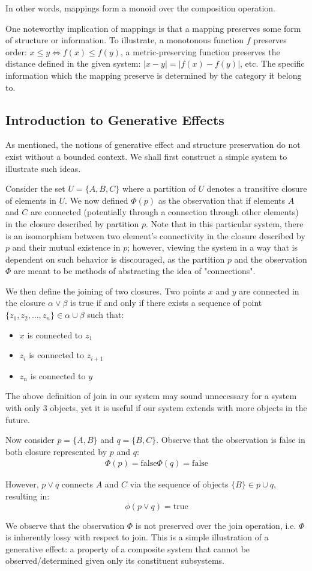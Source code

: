 \documentclass[12pt]{article}
\theoremstyle{definition}
\newcommand{\mo}[1]{\lvert #1 \rvert}
\begin{document}
	In other words, mappings form a monoid over the composition operation.
	
	One noteworthy implication of mappings is that a mapping preserves some form of structure or information. To illustrate, a monotonous function $f$ preserves order: $x \leq y \iff f(x) \leq f(y)$, a metric-preserving function preserves the distance defined in the given system: $\mo{x - y} = \mo{f(x) - f(y)}$, etc. The specific information which the mapping preserve is determined by the category it belong to.
	
	\subsection{Introduction to Generative Effects}
	
	As mentioned, the notions of generative effect and structure preservation do not exist without a bounded context. We shall first construct a simple system to illustrate such ideas.
	
	Consider the set $U = \{A, B, C\}$ where a partition of $U$ denotes a transitive closure of elements in $U$. We now defined $\Phi(p)$ as the observation that if elements $A$ and $C$ are connected (potentially through a connection through other elements) in the closure described by partition $p$. Note that in this particular system, there is an isomorphism between two element's connectivity in the closure described by $p$ and their mutual existence in $p$; however, viewing the system in a way that is dependent on such behavior is discouraged, as the partition $p$ and the observation $\Phi$ are  meant to be methods of abstracting the idea of "connections".
	
	We then define the joining of two closures. Two points $x$ and $y$ are connected in the closure $\alpha \lor \beta$ is true if and only if there exists a sequence of point $\{z_1, z_2, \dots, z_n\} \in \alpha \cup \beta$ such that:
	\begin{itemize}
		\item $x$ is connected to $z_1$
		\item $z_i$ is connected to $z_{i + 1}$
		\item $z_n$ is connected to $y$
	\end{itemize}
	
	The above definition of join in our system may sound unnecessary for a system with only $3$ objects, yet it is useful if our system extends with more objects in the future.
	
	Now consider $p = \{A, B\}$ and $q = \{B, C\}$. Observe that the observation is false in both closure represented by $p$ and $q$:
	\begin{align*}
		\Phi(p) = \text{false}
		\Phi(q) = \text{false}
	\end{align*}
	
	However, $p \lor q$ connects $A$ and $C$ via the sequence of objects $\{B\} \in p \cup q$, resulting in: $$\phi(p \lor q) = \text{true}$$
	
	We observe that the observation $\Phi$ is not preserved over the join operation, i.e. $\Phi$ is inherently lossy with respect to join. This is a simple illustration of a generative effect: a property of a composite system that cannot be observed/determined given only its constituent subsystems.
	
\end{document}
